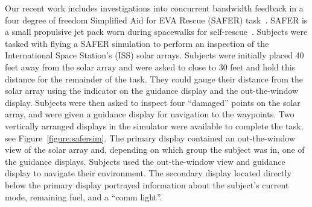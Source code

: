 \documentclass[float=false, crop=false]{standalone}
\begin{document}
Our recent work includes investigations into concurrent bandwidth feedback in a four degree of freedom Simplified Aid for EVA Rescue (SAFER) task~\cite{Karasinski2016Masters, Karasinski2017, Karasinski2016}.
SAFER is a small propulsive jet pack worn during spacewalks for self-rescue~\cite{Vassigh1998}.
Subjects were tasked with flying a SAFER simulation to perform an inspection of the International Space Station's (ISS) solar arrays.
Subjects were initially placed 40 feet away from the solar array and were asked to close to 30 feet and hold this distance for the remainder of the task.
They could gauge their distance from the solar array using the indicator on the guidance display and the out-the-window display.
Subjects were then asked to inspect four ``damaged'' points on the solar array, and were given a guidance display for navigation to the waypoints. %
Two vertically arranged displays in the simulator were available to complete the task, see Figure~\ref{figure:safersim}.
The primary display contained an out-the-window view of the solar array and, depending on which group the subject was in, one of the guidance displays. %
Subjects used the out-the-window view and guidance display to navigate their environment.
The secondary display located directly below the primary display portrayed information about the subject's current mode, remaining fuel, and a ``comm light''.
\end{document}

